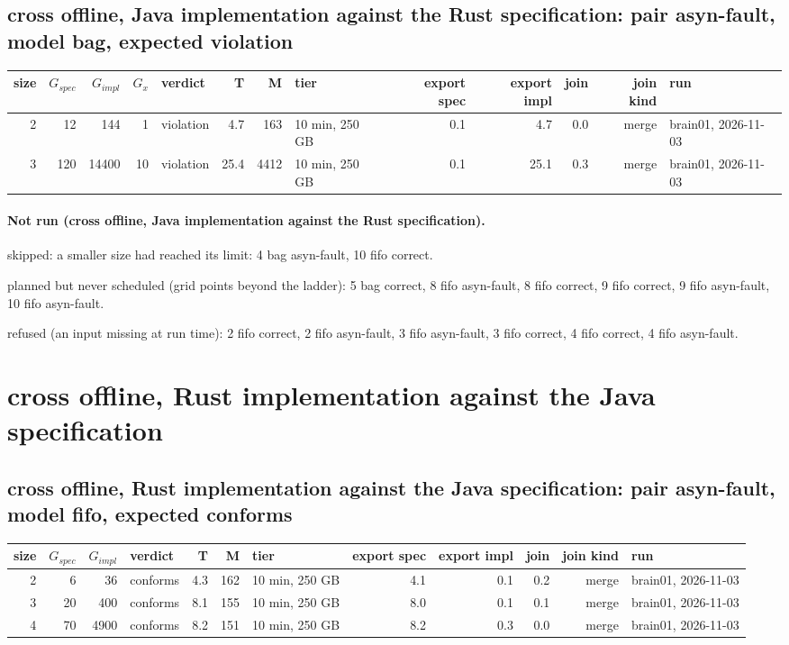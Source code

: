 \documentclass[10pt]{article}
\begin{document}
\subsection*{cross offline, Java implementation against the Rust specification: pair \textsf{asyn-fault}, model bag, expected violation}
\begin{longtable}{@{}rrrrlrrlrrrrl@{}}
\toprule
size & $G_{\mathit{spec}}$ & $G_{\mathit{impl}}$ & $G_x$ & verdict & T & M & tier & export spec & export impl & join & join kind & run \\
\midrule
\endhead
\color{blue} 2 & 12 & 144 & 1 & violation & 4.7 & 163 & 10 min, 250 GB & 0.1 & 4.7 & 0.0 & merge & brain01, 2026-11-03 \\
\color{blue} 3 & 120 & 14400 & 10 & violation & 25.4 & 4412 & 10 min, 250 GB & 0.1 & 25.1 & 0.3 & merge & brain01, 2026-11-03 \\
\bottomrule
\end{longtable}
\paragraph{Not run (cross offline, Java implementation against the Rust specification).}
skipped: a smaller size had reached its limit: 4 bag asyn-fault, 10 fifo correct.\par
planned but never scheduled (grid points beyond the ladder): 5 bag correct, 8 fifo asyn-fault, 8 fifo correct, 9 fifo correct, 9 fifo asyn-fault, 10 fifo asyn-fault.\par
refused (an input missing at run time): 2 fifo correct, 2 fifo asyn-fault, 3 fifo asyn-fault, 3 fifo correct, 4 fifo correct, 4 fifo asyn-fault.\par
\section*{cross offline, Rust implementation against the Java specification}
\subsection*{cross offline, Rust implementation against the Java specification: pair \textsf{asyn-fault}, model fifo, expected conforms}
\begin{longtable}{@{}rrrlrrlrrrrl@{}}
\toprule
size & $G_{\mathit{spec}}$ & $G_{\mathit{impl}}$ & verdict & T & M & tier & export spec & export impl & join & join kind & run \\
\midrule
\endhead
\color{blue} 2 & 6 & 36 & conforms & 4.3 & 162 & 10 min, 250 GB & 4.1 & 0.1 & 0.2 & merge & brain01, 2026-11-03 \\
\color{blue} 3 & 20 & 400 & conforms & 8.1 & 155 & 10 min, 250 GB & 8.0 & 0.1 & 0.1 & merge & brain01, 2026-11-03 \\
\color{blue} 4 & 70 & 4900 & conforms & 8.2 & 151 & 10 min, 250 GB & 8.2 & 0.3 & 0.0 & merge & brain01, 2026-11-03 \\
\bottomrule
\end{longtable}
\end{document}
